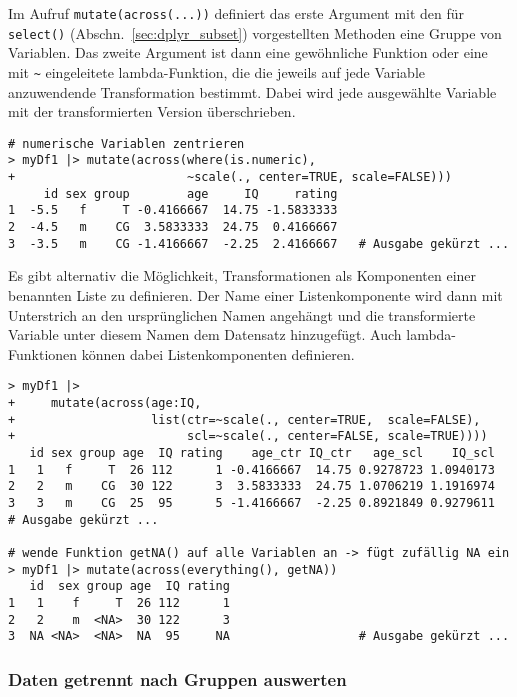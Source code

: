 Im Aufruf \lstinline!mutate(across(...))! definiert das erste Argument mit den für \lstinline!select()! (Abschn.\ \ref{sec:dplyr_subset}) vorgestellten Methoden eine Gruppe von Variablen. Das zweite Argument ist dann eine gewöhnliche Funktion oder eine mit \lstinline!~! eingeleitete lambda-Funktion, die die jeweils auf jede Variable anzuwendende Transformation bestimmt. Dabei wird jede ausgewählte Variable mit der transformierten Version überschrieben.
\begin{lstlisting}
# numerische Variablen zentrieren
> myDf1 |> mutate(across(where(is.numeric),
+                        ~scale(., center=TRUE, scale=FALSE)))
     id sex group        age     IQ     rating
1  -5.5   f     T -0.4166667  14.75 -1.5833333
2  -4.5   m    CG  3.5833333  24.75  0.4166667
3  -3.5   m    CG -1.4166667  -2.25  2.4166667   # Ausgabe gekürzt ...
\end{lstlisting}

Es gibt alternativ die Möglichkeit, Transformationen als Komponenten einer benannten Liste zu definieren. Der Name einer Listenkomponente wird dann mit Unterstrich an den ursprünglichen Namen angehängt und die transformierte Variable unter diesem Namen dem Datensatz hinzugefügt. Auch lambda-Funktionen können dabei Listenkomponenten definieren.
\begin{lstlisting}
> myDf1 |>
+     mutate(across(age:IQ,
+                   list(ctr=~scale(., center=TRUE,  scale=FALSE),
+                        scl=~scale(., center=FALSE, scale=TRUE))))
   id sex group age  IQ rating    age_ctr IQ_ctr   age_scl    IQ_scl
1   1   f     T  26 112      1 -0.4166667  14.75 0.9278723 1.0940173
2   2   m    CG  30 122      3  3.5833333  24.75 1.0706219 1.1916974
3   3   m    CG  25  95      5 -1.4166667  -2.25 0.8921849 0.9279611
# Ausgabe gekürzt ...

# wende Funktion getNA() auf alle Variablen an -> fügt zufällig NA ein
> myDf1 |> mutate(across(everything(), getNA))
   id  sex group age  IQ rating
1   1    f     T  26 112      1
2   2    m  <NA>  30 122      3
3  NA <NA>  <NA>  NA  95     NA                  # Ausgabe gekürzt ...
\end{lstlisting}

\subsubsection{Daten getrennt nach Gruppen auswerten}

